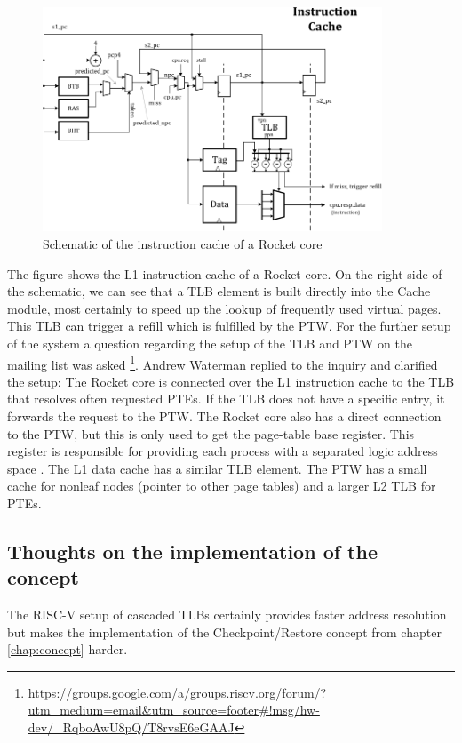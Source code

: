\begin{figure}
    \centering
    \includegraphics[width=0.9\textwidth]{figures/lowrisc_icache}
    \caption{Schematic of the instruction cache of a Rocket core
        \cite{lowrisc_rocket_core_overview}}
    \label{fig:lowrisc_icache}
\end{figure}
The figure shows the L1 instruction cache of a Rocket core.
On the right side of the schematic, we can see that a TLB element
is built directly into the Cache module, most certainly to speed up
the lookup of frequently used virtual pages. This TLB can trigger
a refill which is fulfilled by the PTW. For the further setup of the system a question regarding the setup of the TLB and PTW on the mailing list
was asked 
\footnote{\url{https://groups.google.com/a/groups.riscv.org/forum/?utm_medium=email&utm_source=footer\#!msg/hw-dev/_RqboAwU8pQ/T8rvsE6eGAAJ}}.
Andrew Waterman replied to the inquiry and clarified the setup:
The Rocket core is connected over the L1 instruction cache to the
TLB that resolves often requested PTEs. If the TLB does not have
a specific entry, it forwards the request to the PTW.
The Rocket core also has a direct connection to the PTW, but this
is only used to get the page-table base register.
This register is responsible for providing each process with a
separated logic address space
\cite["Page Tables" -> "The PTBR"]{uniminnesota_vm_address_translation}.
The L1 data cache has a similar TLB element.
The PTW has a small cache for nonleaf nodes (pointer to other
page tables) and a larger L2 TLB for PTEs.

\subsection{Thoughts on the implementation of the concept}
\label{subsec:thoughs_impl}
The RISC-V setup of cascaded TLBs certainly provides faster address resolution
but makes the implementation of the Checkpoint/Restore concept from chapter
\ref{chap:concept} harder.

